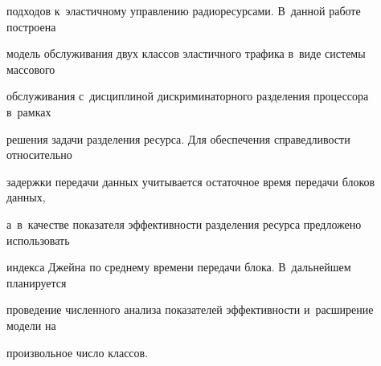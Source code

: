 подходов к~эластичному управлению радиоресурсами. В~данной работе построена 


модель обслуживания двух классов эластичного трафика в~виде сис\-те\-мы массового 


обслуживания с~дисциплиной дискриминаторного разделения процессора в~рамках 


решения задачи разделения ресурса. Для обеспечения справедливости относительно 


задержки передачи данных учитывается остаточное время передачи блоков данных, 


а~в~качестве показателя эффективности разделения ресурса предложено использовать 


индекса Джейна по среднему времени передачи блока. В~дальнейшем планируется 


проведение численного анализа показателей эффективности и~расширение модели на 


произвольное число классов.








